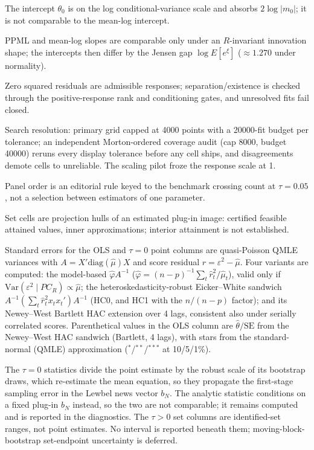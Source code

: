 \begin{table}[!htbp]
\begin{threeparttable}
\begin{tablenotes}[flushleft]
\item The intercept $\theta_0$ is on the log conditional-variance scale and absorbs $2\log|m_0|$; it is not comparable to the mean-log intercept.
\item PPML and mean-log slopes are comparable only under an $R$-invariant innovation shape; the intercepts then differ by the Jensen gap $\log E[e^{\xi}]$ ($\approx 1.270$ under normality).
\item Zero squared residuals are admissible responses; separation/existence is checked through the positive-response rank and conditioning gates, and unresolved fits fail closed.
\item Search resolution: primary grid capped at 4000 points with a 20000-fit budget per tolerance; an independent Morton-ordered coverage audit (cap 8000, budget 40000) reruns every display tolerance before any cell ships, and disagreements demote cells to unreliable. The scaling pilot froze the response scale at 1.
\item Panel order is an editorial rule keyed to the benchmark crossing count at $\tau{=}0.05$, not a selection between estimators of one parameter.
\item Set cells are projection hulls of an estimated plug-in image: certified feasible attained values, inner approximations; interior attainment is not established.
\item Standard errors for the OLS and $\tau{=}0$ point columns are quasi-Poisson QMLE variances with $A = X'\mathrm{diag}(\hat\mu)X$ and score residual $\hat r = \varepsilon^2 - \hat\mu$. Four variants are computed: the model-based $\hat\varphi A^{-1}$ ($\hat\varphi = (n{-}p)^{-1}\sum_t \hat r_t^2/\hat\mu_t$), valid only if $\mathrm{Var}(\varepsilon^2 \mid PC_R) \propto \hat\mu$; the heteroskedasticity-robust Eicker--White sandwich $A^{-1}(\sum_t \hat r_t^2 x_t x_t')A^{-1}$ (HC0, and HC1 with the $n/(n{-}p)$ factor); and its Newey--West Bartlett HAC extension over 4 lags, consistent also under serially correlated scores. Parenthetical values in the OLS column are $\hat\theta/\mathrm{SE}$ from the Newey--West HAC sandwich (Bartlett, 4 lags), with stars from the standard-normal (QMLE) approximation ($^{*}$/$^{**}$/$^{***}$ at 10/5/1\%).
\item The $\tau{=}0$ statistics divide the point estimate by the robust scale of its bootstrap draws, which re-estimate the mean equation, so they propagate the first-stage sampling error in the Lewbel news vector $b_N$. The analytic statistic conditions on a fixed plug-in $b_N$ instead, so the two are not comparable; it remains computed and is reported in the diagnostics. The $\tau{>}0$ set columns are identified-set ranges, not point estimates. No interval is reported beneath them; moving-block-bootstrap set-endpoint uncertainty is deferred.
\end{tablenotes}
\end{threeparttable}
\end{table}
